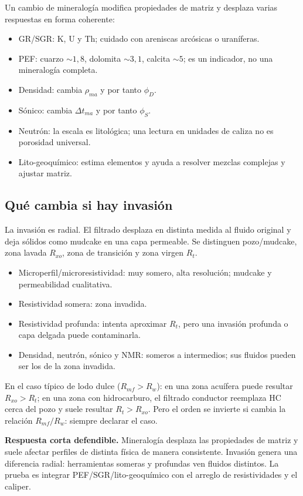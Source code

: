 \documentclass[10.5pt,a4paper]{article}
\newcommand{\oral}[1]{\par\textcolor{petro}{\textbf{Respuesta corta defendible.} #1}\par}
\begin{document}
Un cambio de mineralog\'ia modifica propiedades de matriz y desplaza varias respuestas en forma coherente:
\begin{itemize}
  \item GR/SGR: K, U y Th; cuidado con areniscas arc\'osicas o uran\'iferas.
  \item PEF: cuarzo $\sim1{,}8$, dolomita $\sim3{,}1$, calcita $\sim5$; es un indicador, no una mineralog\'ia completa.
  \item Densidad: cambia $\rho_{ma}$ y por tanto $\phi_D$.
  \item S\'onico: cambia $\Delta t_{ma}$ y por tanto $\phi_S$.
  \item Neutr\'on: la escala es litol\'ogica; una lectura en unidades de caliza no es porosidad universal.
  \item Lito-geoqu\'imico: estima elementos y ayuda a resolver mezclas complejas y ajustar matriz.
\end{itemize}

\subsection{Qu\'e cambia si hay invasi\'on}

La invasi\'on es radial. El filtrado desplaza en distinta medida al fluido original y deja s\'olidos como mudcake en una capa permeable. Se distinguen pozo/mudcake, zona lavada $R_{xo}$, zona de transici\'on y zona virgen $R_t$.

\begin{itemize}
  \item Microperfil/microresistividad: muy somero, alta resoluci\'on; mudcake y permeabilidad cualitativa.
  \item Resistividad somera: zona invadida.
  \item Resistividad profunda: intenta aproximar $R_t$, pero una invasi\'on profunda o capa delgada puede contaminarla.
  \item Densidad, neutr\'on, s\'onico y NMR: someros a intermedios; sus fluidos pueden ser los de la zona invadida.
\end{itemize}

En el caso t\'ipico de lodo dulce ($R_{mf}>R_w$): en una zona acu\'ifera puede resultar $R_{xo}>R_t$; en una zona con hidrocarburo, el filtrado conductor reemplaza HC cerca del pozo y suele resultar $R_t>R_{xo}$. Pero el orden se invierte si cambia la relaci\'on $R_{mf}/R_w$: siempre declarar el caso.

\oral{Mineralog\'ia desplaza las propiedades de matriz y suele afectar perfiles de distinta f\'isica de manera consistente. Invasi\'on genera una diferencia radial: herramientas someras y profundas ven fluidos distintos. La prueba es integrar PEF/SGR/lito-geoqu\'imico con el arreglo de resistividades y el caliper.}
\end{document}

